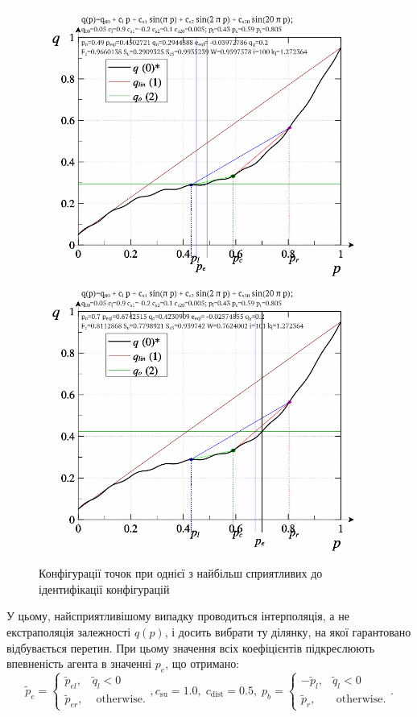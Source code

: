 \documentclass[a4paper,13pt]{atuaref}
\newlength\TW
\begin{document}
\begin{figure}[htb!]
  \centerline{
    \includegraphics[width=49\TW]{p3/p/pq_sin-p_pq_po=049.png}
    \hfill
    \includegraphics[width=49\TW]{p3/p/pq_sin-p_pq_po=070.png}
  }
  \caption{Конфігурації точок при однієї з найбільш сприятливих до ідентифікації конфігурацій}
  \label{atu:f:pq_4}
\end{figure}

У цьому, найсприятливішому випадку проводиться інтерполяція, а не екстраполяція
залежності $ q(p)$, і досить вибрати ту ділянку, на якої гарантовано
відбувається перетин. При цьому значення всіх коефіцієнтів підкреслюють
впевненість агента в значенні $ p_e $, що отримано:
%
\begin{equation}
  \tilde{p}_e
  =
  \begin{cases}
    \tilde{p}_{el}, & \tilde{q}_l < 0
    \\
    \tilde{p}_{er}, & \text{ otherwise}.
  \end{cases}
  ,
  c_\mathrm{su} = 1.0, \;  c_\mathrm{dist} = 0.5,  \;
  p_b =
  \begin{cases}
    -\tilde{p}_l, & \tilde{q}_l < 0
    \\
    \tilde{p}_r, & \text{ otherwise}.
  \end{cases}.
  \label{atu:eq:pr_e4}
\end{equation}
\end{document}

